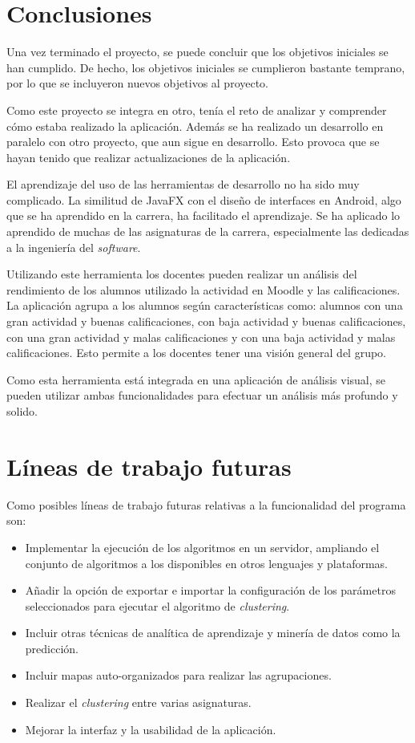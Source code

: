 
\section{Conclusiones}
Una vez terminado el proyecto, se puede concluir que los objetivos iniciales se han cumplido. De hecho, los objetivos iniciales se cumplieron bastante temprano, por lo que se incluyeron nuevos objetivos al proyecto.

Como este proyecto se integra en otro, tenía el reto de analizar y comprender cómo estaba realizado la aplicación. Además se ha realizado un desarrollo en paralelo con otro proyecto, que aun sigue en desarrollo. Esto provoca que se hayan tenido que realizar actualizaciones de la aplicación.

El aprendizaje del uso de las herramientas de desarrollo no ha sido muy complicado. La similitud de JavaFX con el diseño de interfaces en Android, algo que se ha aprendido en la carrera, ha facilitado el aprendizaje. Se ha aplicado lo aprendido de muchas de las asignaturas de la carrera, especialmente las dedicadas a la ingeniería del \emph{software}.

Utilizando este herramienta los docentes pueden realizar un análisis del rendimiento de los alumnos utilizado la actividad en Moodle y las calificaciones. La aplicación agrupa a los alumnos según características como: alumnos con una gran actividad y buenas calificaciones, con baja actividad y buenas calificaciones, con una gran actividad y malas calificaciones y con una baja actividad y malas calificaciones. Esto permite a los docentes tener una visión general del grupo.

Como esta herramienta está integrada en una aplicación de análisis visual, se pueden utilizar ambas funcionalidades para efectuar un análisis más profundo y solido. 

\section{Líneas de trabajo futuras}
Como posibles líneas de trabajo futuras relativas a la funcionalidad del programa son:
\begin{itemize}
	\item Implementar la ejecución de los algoritmos en un servidor, ampliando el conjunto de algoritmos a los disponibles en otros lenguajes y plataformas.
	\item Añadir la opción de exportar e importar la configuración de los parámetros seleccionados para ejecutar el algoritmo de \emph{clustering}.
	\item Incluir otras técnicas de analítica de aprendizaje y minería de datos como la predicción.
	\item Incluir mapas auto-organizados para realizar las agrupaciones.
	\item Realizar el \emph{clustering} entre varias asignaturas.
	\item Mejorar la interfaz y la usabilidad de la aplicación.
\end{itemize}